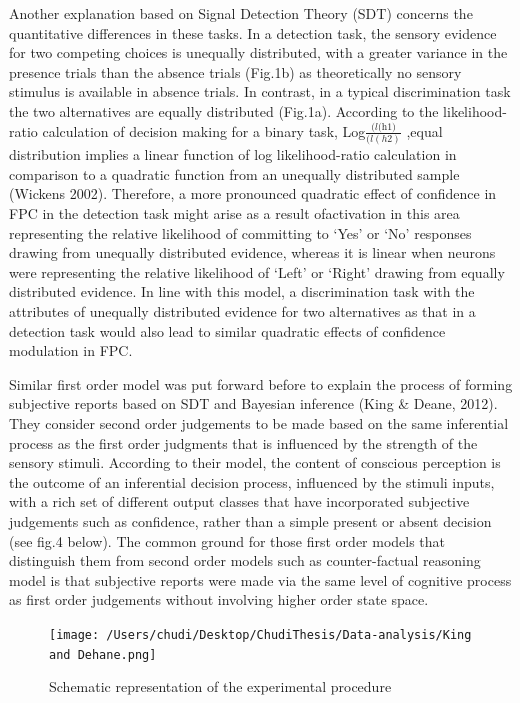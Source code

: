 \documentclass[
]{article}
\begin{document}
Another explanation based on Signal Detection Theory (SDT) concerns the
quantitative differences in these tasks. In a detection task, the
sensory evidence for two competing choices is unequally distributed,
with a greater variance in the presence trials than the absence trials
(Fig.1b) as theoretically no sensory stimulus is available in absence
trials. In contrast, in a typical discrimination task the two
alternatives are equally distributed (Fig.1a). According to the
likelihood-ratio calculation of decision making for a binary task,
Log\(\frac{(\textit{l(h1)} }{(l(h2)}\) ,equal distribution implies a
linear function of log likelihood-ratio calculation in comparison to a
quadratic function from an unequally distributed sample (Wickens 2002).
Therefore, a more pronounced quadratic effect of confidence in FPC in
the detection task might arise as a result ofactivation in this area
representing the relative likelihood of committing to `Yes' or `No'
responses drawing from unequally distributed evidence, whereas it is
linear when neurons were representing the relative likelihood of `Left'
or `Right' drawing from equally distributed evidence. In line with this
model, a discrimination task with the attributes of unequally
distributed evidence for two alternatives as that in a detection task
would also lead to similar quadratic effects of confidence modulation in
FPC.

Similar first order model was put forward before to explain the process
of forming subjective reports based on SDT and Bayesian inference (King
\& Deane, 2012). They consider second order judgements to be made based
on the same inferential process as the first order judgments that is
influenced by the strength of the sensory stimuli. According to their
model, the content of conscious perception is the outcome of an
inferential decision process, influenced by the stimuli inputs, with a
rich set of different output classes that have incorporated subjective
judgements such as confidence, rather than a simple present or absent
decision (see fig.4 below). The common ground for those first order
models that distinguish them from second order models such as
counter-factual reasoning model is that subjective reports were made via
the same level of cognitive process as first order judgements without
involving higher order state space.

\begin{figure}
\centering
\texttt{[image: /Users/chudi/Desktop/ChudiThesis/Data-analysis/King and Dehane.png]}
\caption{Schematic representation of the experimental procedure}
\end{figure}
\end{document}
